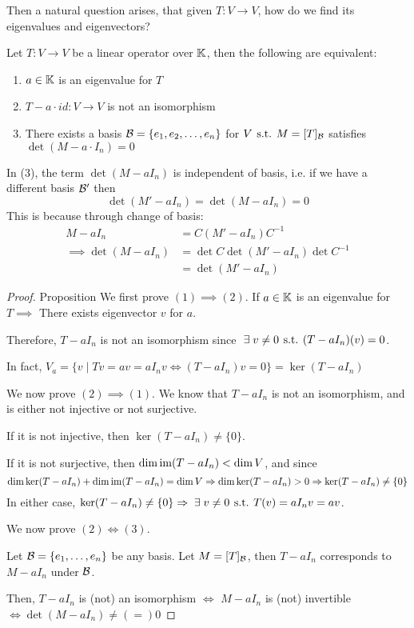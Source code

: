 Then a natural question arises, that given \(T: V \to V\), how do we find its eigenvalues and eigenvectors?

\begin{proposition}
    Let \(T: V \to V\) be a linear operator over \(\mathbb{K}\), then the following are equivalent:
    \begin{enumerate}
        \item \(a \in \mathbb{K}\) is an eigenvalue for \(T\)
        \item \(T - a \cdot id: V \to V\) is not an isomorphism
        \item There exists a basis \(\mathcal{B} = \{e_1, e_2, \ldots, e_n\}\) for \(V \hspace*{4pt}\text{s.t.}\hspace*{4pt} M= [T]_{\mathcal{B}} \) satisfies \(\det (M - a\cdot I_n) = 0\)
    \end{enumerate}
\end{proposition}

\begin{remark}
    In (3), the term \(\det (M - a I_n)\) is independent of basis, i.e. if we have a different basis \(\mathcal{B} '\) then \[
        \det(M' - a I_n) = \det(M - a I_n) =  0
    \]
    This is because through change of basis:
    \begin{align*}
        M - a I_n              & = C (M' - a I_n) C^{-1}               \\
        \implies \det(M-a I_n) & = \det C \det (M' - aI_n) \det C^{-1} \\
                               & = \det (M' - a I_n)
    \end{align*}
\end{remark}

\begin{proof} {Proposition}
    We first prove \((1) \implies (2)\). If \(a \in \mathbb{K}\) is an eigenvalue for \(T \implies \) There exists eigenvector \(v\) for \(a\).

    Therefore, \(T - a I_n\) is not an isomorphism since \(\exists v \neq 0 \st (T - a I_n) (v) = 0\).

    In fact, \(V_a  = \{v \mid Tv = av = aI_n v \Leftrightarrow (T - a I_n) v = 0 \} = \ker(T  - a I_n)\)

    We now prove \((2) \implies (1)\). We know that \(T - aI_n\) is not an isomorphism, and is either not injective or not surjective.

    If it is not injective, then \(\ker(T - aI_n) \neq \{0\}\).

    If it is not surjective, then \(\dim \mathrm{im} (T - aI_n) < \dim V\), and since \[
        \dim \ker (T - aI_n) + \dim \mathrm{im} (T - aI_n)= \dim V \Rightarrow \dim \ker (T - aI_n) > 0 \Rightarrow \ker (T - aI_n) \neq \{0\}
    \]
    In either case, \(\ker (T - aI_n) \neq \{0\} \implies \exists v \neq 0 \st T(v) = a I_n v = av\).

    We now prove \((2) \Leftrightarrow (3)\).

    Let \(\mathcal{B} = \{e_1, \dots, e_n\}\) be any basis. Let \(M = [T]_{\mathcal{B}}\), then \(T - aI_n\) corresponds to \(M - aI_n\) under \(\mathcal{B}\).

    Then, \(T - aI_n\) is (not) an isomorphism \(\Leftrightarrow\) \(M - aI_n\) is (not) invertible \(\Leftrightarrow \det (M - aI_n) \neq (=) 0\)
\end{proof}

